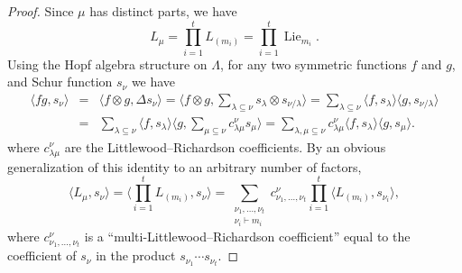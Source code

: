\documentclass[12pt]%
{amsart}
\newcommand{\la}{{\lambda}}
\newcommand{\al}{{\alpha}}
\newcommand{\Lie}{\operatorname{Lie}}
\def\red#1{{\color{red}{#1}}}
\theoremstyle{plain}
\theoremstyle{definition}
\theoremstyle{remark}
\begin{document}
\begin{proof}


Since $\mu$ has distinct parts, we have 
\[
    L_\mu
    = \prod_{i=1}^t L_{(m_i)}
    = \prod_{i=1}^t \Lie_{m_i}.
\]
    Using the Hopf algebra structure on $\Lambda$, for any two symmetric functions $f$ and $g$, and Schur function $s_\nu$ we have
    \begin{eqnarray}\label{eq:Hopf}
        \langle fg, s_\nu \rangle
        &=& \langle f \otimes g, \Delta s_\nu \rangle
        = \langle f\otimes g, \sum_{\la \subseteq \nu} s_\la \otimes s_{\nu/\la} \rangle
        = \sum_{\la \subseteq \nu} \langle f, s_\la \rangle \langle g, s_{\nu/\la} \rangle \nonumber 
        \\
        &=& \sum_{\la \subseteq \nu} \langle f, s_\la \rangle \langle g,\sum_{\mu \subseteq \nu} c^\nu_{\la \mu} s_\mu \rangle 
        = \sum_{\la,\mu \subseteq \nu} c^\nu_{\la \mu} \langle f, s_\la \rangle \langle g, s_\mu\rangle.
    \end{eqnarray}
where $c^\nu_{\la \mu}$ are the Littlewood--Richardson coefficients.
By an obvious generalization of this identity
to an arbitrary number of factors,
\[
    \langle L_\mu,s_\nu \rangle
    = \langle \prod_{i=1}^t L_{(m_i)}, s_\nu \rangle
    = \sum_{\substack{\nu_1,\ldots,\nu_t\\ \nu_i \vdash m_i}} c^\nu_{\nu_1,\ldots,\nu_t} \prod_{i=1}^t \langle L_{(m_i)},s_{\nu_i} \rangle,
\]
where  
$c^\nu_{\nu_1,\ldots,\nu_t}$ is a ``multi-Littlewood--Richardson coefficient'' equal to the coefficient of $s_\nu$ in the product $s_{\nu_1} \cdots s_{\nu_t}$.


\end{proof}
\end{document}
